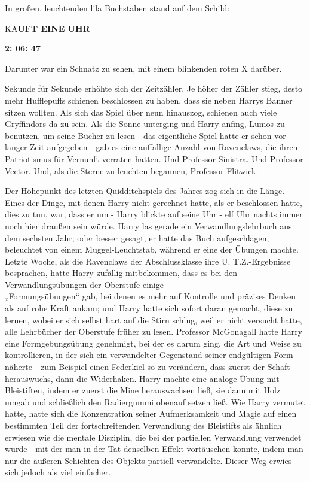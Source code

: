 {In großen, leuchtenden lila Buchstaben stand auf dem Schild:

KA\textbf{UFT EINE UHR}

\hfill\break

\textbf{2: 06: 47}

Darunter war ein Schnatz zu sehen, mit einem blinkenden roten X darüber.

Sekunde für Sekunde erhöhte sich der Zeitzähler. Je höher der Zähler stieg, desto mehr Hufflepuffs schienen beschlossen zu haben, dass sie neben Harrys Banner sitzen wollten. Als sich das Spiel über neun hinauszog, schienen auch viele Gryffindors da zu sein. Als die Sonne unterging und Harry anfing, Lumos zu benutzen, um seine Bücher zu lesen - das eigentliche Spiel hatte er schon vor langer Zeit aufgegeben - gab es eine auffällige Anzahl von Ravenclaws, die ihren Patriotismus für Vernunft verraten hatten. Und Professor Sinistra. Und Professor Vector. Und, als die Sterne zu leuchten begannen, Professor Flitwick.

Der Höhepunkt des letzten Quidditchspiels des Jahres zog sich in die Länge. Eines der Dinge, mit denen Harry nicht gerechnet hatte, als er beschlossen hatte, dies zu tun, war, dass er um - Harry blickte auf seine Uhr - elf Uhr nachts immer noch hier draußen sein würde. Harry las gerade ein Verwandlungslehrbuch aus dem sechsten Jahr; oder besser gesagt, er hatte das Buch aufgeschlagen, beleuchtet von einem Muggel-Leuchtstab, während er eine der Übungen machte. Letzte Woche, als die Ravenclaws der Abschlussklasse ihre U. T.Z.-Ergebnisse besprachen, hatte Harry zufällig mitbekommen, dass es bei den Verwandlungsübungen der Oberstufe einige\\ „Formungsübungen“ gab, bei denen es mehr auf Kontrolle und präzises Denken als auf rohe Kraft ankam; und Harry hatte sich sofort daran gemacht, diese zu lernen, wobei er sich selbst hart auf die Stirn schlug, weil er nicht versucht hatte, alle Lehrbücher der Oberstufe früher zu lesen. Professor McGonagall hatte Harry eine Formgebungsübung genehmigt, bei der es darum ging, die Art und Weise zu kontrollieren, in der sich ein verwandelter Gegenstand seiner endgültigen Form näherte - zum Beispiel einen Federkiel so zu verändern, dass zuerst der Schaft herauswuchs, dann die Widerhaken. Harry machte eine analoge Übung mit Bleistiften, indem er zuerst die Mine herauswachsen ließ, sie dann mit Holz umgab und schließlich den Radiergummi obenauf setzen ließ. Wie Harry vermutet hatte, hatte sich die Konzentration seiner Aufmerksamkeit und Magie auf einen bestimmten Teil der fortschreitenden Verwandlung des Bleistifts als ähnlich erwiesen wie die mentale Disziplin, die bei der partiellen Verwandlung verwendet wurde - mit der man in der Tat denselben Effekt vortäuschen konnte, indem man nur die äußeren Schichten des Objekts partiell verwandelte. Dieser Weg erwies sich jedoch als viel einfacher.

}
